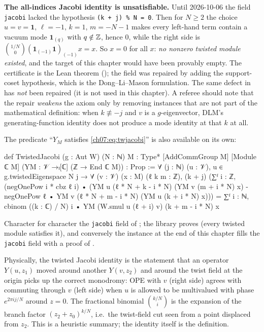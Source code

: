 \begin{warning}
\textbf{The all-indices Jacobi identity is unsatisfiable.} Until 2026-10-06 the field
\verb|jacobi| lacked the hypothesis \verb|(k + j) % N = 0|. Then for $N\ge2$ the choice
$u=v=\mathbf 1$, $\ell=-1$, $k=1$, $m=-N-1$ makes every left-hand term contain a vacuum mode
$\mathbf 1_{(q)}$ with $q\notin{\mathbb{Z}}$, hence $0$, while the right side is
$\binom{1/N}{0}(\mathbf 1_{(-1)}\mathbf 1)_{(-1)}x = x$. So $x=0$ for all $x$: \emph{no nonzero
twisted module existed}, and the target of this chapter would have been provably empty. The
certificate is the Lean theorem 
(); the field was repaired by adding
the support-coset hypothesis, which is the Dong--Li--Mason formulation. The same defect in
 has \emph{not} been repaired (it is not used in this chapter).
A referee should note that the repair \emph{weakens} the axiom only by removing instances that
are not part of the mathematical definition: when $k\not\equiv -j$ and $v$ is a $g$-eigenvector,
DLM's generating-function identity does not produce a mode identity at that $k$ at all.
\end{warning}

The predicate ``$Y_M$ satisfies \eqref{ch07:eq:twjacobi}'' is also available on its own:

\begin{leancode}
def TwistedJacobi (g : Aut W) (N : ℕ) {M : Type*} [AddCommGroup M] [Module ℂ M]
    (YM : 𝒱 →ₗ[ℂ] (ℤ → End ℂ M)) : Prop :=
  ∀ (j : ℕ) (u : 𝒱), u ∈ g.twistedEigenspace N j → ∀ (v : 𝒱) (x : M) (ℓ k m : ℤ),
    (k + j) %
    (∑ᶠ i : ℤ, (negOnePow i * cbz ℓ i) •
        (YM u (ℓ * N + k - i * N) (YM v (m + i * N) x)
          - negOnePow ℓ • YM v (ℓ * N + m - i * N) (YM u (k + i * N) x)))
      = ∑ᶠ i : ℕ, cbinom ((k : ℂ) / N) i • YM (W.smul u (ℓ + i) v) (k + m - i * N) x
\end{leancode}

\begin{dictionary}
Character for character the \verb|jacobi| field of ; the library proves
 (every twisted module satisfies it), and conversely the
instance at the end of this chapter fills the \verb|jacobi| field with a proof of
.
\end{dictionary}

\begin{physics}
Physically, the twisted Jacobi identity is the statement that an operator $Y(u,z_1)$ moved around another $Y(v,z_2)$ and around the twist field at the origin picks up the correct monodromy: OPE with $v$ (right side) agrees with commuting through $v$ (left side) when $u$ is allowed to be multivalued with phase $e^{2\pi i j/N}$ around $z=0$. The fractional binomial $\binom{k/N}{i}$ is the expansion of the branch factor $(z_2+z_0)^{k/N}$, i.e.\ the twist-field cut seen from a point displaced from $z_2$. This is a heuristic summary; the identity itself is the definition.
\end{physics}

